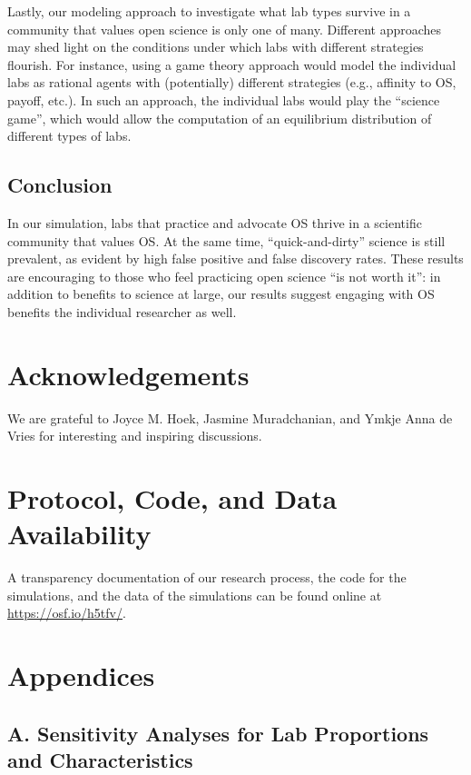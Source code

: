 \documentclass[meta, authordate]{jote-new-article}
\begin{document}
Lastly, our modeling approach to investigate what lab types survive in a community that values open science is only one of many. Different approaches may shed light on the conditions under which labs with different strategies flourish. For instance, using a game theory approach would model the individual labs as rational agents with (potentially) different strategies (e.g., affinity to OS, payoff, etc.). In such an approach, the individual labs would play the ``science game'', which would allow the computation of an equilibrium distribution of different types of labs.

\subsection{Conclusion}

In our simulation, labs that practice and advocate OS thrive in a scientific community that values OS. At the same time, ``quick-and-dirty'' science is still prevalent, as evident by high false positive and false discovery rates. These results are encouraging to those who feel practicing open science ``is not worth it'': in addition to benefits to science at large, our results suggest engaging with OS benefits the individual researcher as well.

\section{Acknowledgements}

We are grateful to Joyce M. Hoek, Jasmine Muradchanian, and Ymkje Anna de Vries for interesting and inspiring discussions.

\section{Protocol, Code, and Data Availability}

A transparency documentation of our research process, the code for the simulations, and the data of the simulations can be found online at \href{https://osf.io/h5tfv/}{https://osf.io/h5tfv/}.

\printbibliography

\newpage
\onecolumn
\appendix

\section{Appendices}
\subsection{A. Sensitivity Analyses for Lab Proportions and Characteristics}\label{sec:appendix_a}
\end{document}

